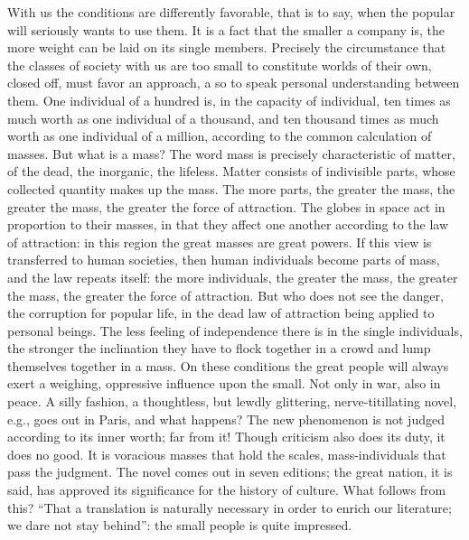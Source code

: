 \documentclass[12pt,a4paper,openany]{book}
\newcommand{\opage}[1]{\marginnote{\footnotesize\textit{[#1]}}}
\newcounter{lect}
\begin{document}
With us the conditions are differently favorable, that is to say,
when the popular will seriously wants to use them. It is a
fact that the smaller a company is, the more weight
can be laid on its single members.
Precisely the circumstance that the classes of society with
us are too small to constitute worlds of their own, closed off,
must favor an approach, a so to speak
\setcounter{footnote}{0}%
\opage{152}personal understanding between them. One individual of a hundred
is, in the capacity of individual, ten times as much
worth as one individual of a thousand, and ten thousand times
as much worth as one individual of a million, according to
the common calculation of masses. But what is a mass?
The word mass is precisely characteristic of matter, of the
dead, the inorganic, the lifeless. Matter consists of
indivisible parts, whose collected quantity makes up the mass.
The more parts, the greater the mass, the greater the mass,
the greater the force of attraction. The globes in space
act in proportion to their masses, in that they affect one another
according to the law of attraction: in this region the
great masses are great powers. If this view is transferred
to human societies, then human individuals become
parts of mass, and the law repeats itself: the more
individuals, the greater the mass, the greater the mass, the
greater the force of attraction. But who does not see the
danger, the corruption for popular life, in the dead
law of attraction being applied to personal beings. The
less feeling of independence there is in the single
individuals, the stronger the inclination they have to
flock together in a crowd and lump themselves together in a mass.
On these conditions the great people will always exert
a weighing, oppressive influence upon the small. Not
only in war, also in peace. A silly fashion, a thoughtless,
but lewdly glittering, nerve-titillating novel,
e.g., goes out in Paris, and what happens? The new
phenomenon is not judged according to its inner worth;
far from it! Though criticism also does its duty, it does
no good. It is voracious masses that hold the scales,
mass-individuals that pass the judgment. The novel comes
out in seven editions; the great nation, it is said, has approved
\setcounter{footnote}{0}%
\opage{153}its significance for the history of culture. What follows from this?
``That a translation is naturally necessary in order to
enrich our literature; we dare not stay behind'': the
small people is quite impressed.
\end{document}
